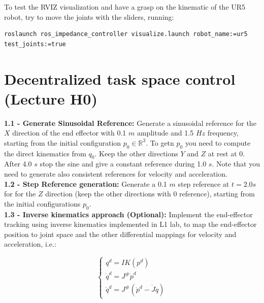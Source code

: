 \documentclass[11pt]{article}
\newcommand{\Rnum}{\mathbb{R}} %
\begin{document}
%
%

To test the RVIZ visualization and have a grasp on the kinematic of the UR5 robot, try to move the joints with the sliders, running:
%
\begin{verbatim}
roslaunch ros_impedance_controller visualize.launch robot_name:=ur5 test_joints:=true 
\end{verbatim}

\section{Decentralized task space control (Lecture H0)}


\textbf{1.1 - Generate Sinusoidal Reference:}
Generate a sinusoidal reference for the $X$ direction of the end effector with 0.1 $m$  amplitude and 1.5 $Hz$ frequency, starting from the initial configuration $p_0 \in \Rnum^3$. 
To getn $p_0$ you need to compute the direct kinematics from $q_0$. Keep the other directions $Y$ and $Z$ at rest at 0. After 4.0 $s$ stop the sine and give a constant reference during 1.0 $s$. Note that you need to generate also consistent references for velocity and acceleration.\\



\textbf{1.2 - Step Reference generation:}
Generate a 0.1 $m$  step reference at $t= 2.0s$ for  for the $Z$ direction
 (keep the other directions with 0 reference), starting from the initial configurations $p_0$.\\


\textbf{1.3 - Inverse kinematics approach (Optional):}  Implement the end-effector tracking using inverse kinematics implemented in L1 lab, to map the end-effector position to joint space and the other differential mappings for velocity and acceleration, i.e.:


\begin{equation*}
\begin{cases}
q^d = IK(p^d) \\
\dot{q}^d =  J^{\#} \dot{p}^d \\
\ddot{q}^d =  J^{\#} ( \ddot{p}^d - \dot{J}\dot{q} )
\end{cases}
\end{equation*}
\end{document}
